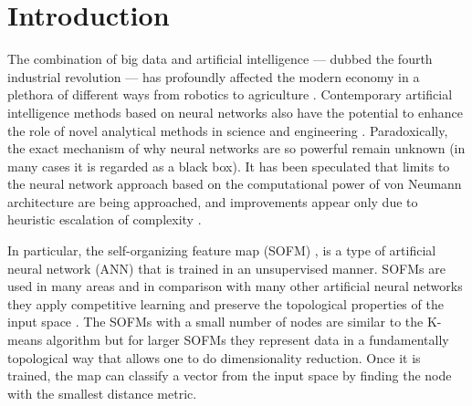 \documentclass[pra,showkeys,twocolumn,showpacs]{revtex4-1}
\begin{document}
\section{Introduction}
The combination of big data and artificial intelligence ---  dubbed the fourth industrial revolution --- has profoundly affected the modern economy in a plethora of different ways from robotics to agriculture \cite{Lecun2015, ghahramani2015,schwab2017,esteva2019, tyrsa2017}. 
Contemporary artificial intelligence methods based on neural networks also have the potential to enhance the role of novel analytical methods in science and engineering \cite{kaggle2014, radovic2018, butler2018, radovic2018}. 
Paradoxically, the exact mechanism of why neural networks are so powerful remain unknown (in many cases it is regarded as a black box).  
It has been speculated that limits to the neural network approach based on the computational power of von Neumann architecture are being approached, 
and improvements appear only due to heuristic escalation of complexity \cite{marcus2018,sze2017,kourtis2020}.

In particular, the self-organizing feature map (SOFM) \cite{kohonen1990,kohonen1996,kohonen1997}, is a type of artificial neural network (ANN) 
that is trained in an unsupervised manner. 
SOFMs are used in many areas \cite{vilibic2016, guido1998, doszkocs1990, jones2012,mori2019,corsello2017,zhu2018,chea2016} 
and in comparison with many other artificial neural networks they apply competitive learning and preserve the topological properties of the input space \cite{kiviluotoa1996}. 
The SOFMs with a small number of nodes are similar to the K-means algorithm 
but for larger SOFMs they represent data in a fundamentally topological way that allows one to do dimensionality reduction.  
Once it is trained, the map can classify a vector from the input space by finding the node with the smallest distance metric. 
\end{document}
